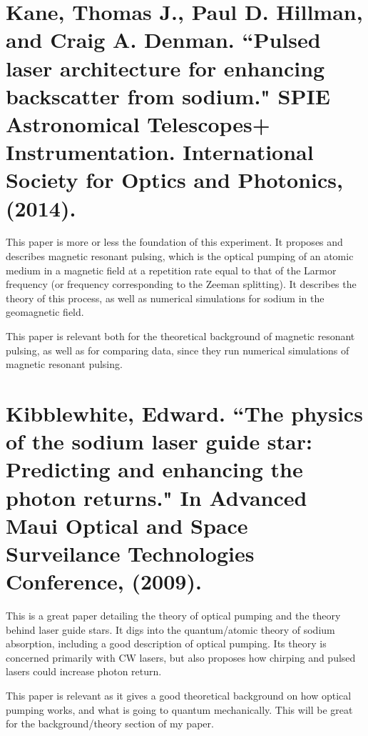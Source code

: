 \documentclass{article}
\begin{document}


%

\section*{Kane, Thomas J., Paul D. Hillman, and Craig A. Denman. ``Pulsed laser architecture for enhancing backscatter from sodium." SPIE Astronomical Telescopes+ Instrumentation. International Society for Optics and Photonics, (2014).}

This paper is more or less the foundation of this experiment. It proposes and describes magnetic resonant pulsing, which is the optical pumping of an atomic medium in a magnetic field at a repetition rate equal to that of the Larmor frequency (or frequency corresponding to the Zeeman splitting). It describes the theory of this process, as well as numerical simulations for sodium in the geomagnetic field.

This paper is relevant both for the theoretical background of magnetic resonant pulsing, as well as for comparing data, since they run numerical simulations of magnetic resonant pulsing.

%


\section*{Kibblewhite, Edward. ``The physics of the sodium laser guide star: Predicting and enhancing the photon returns." In Advanced Maui Optical and Space Surveilance Technologies Conference, (2009).}

This is a great paper detailing the theory of optical pumping and the theory behind laser guide stars. It digs into the quantum/atomic theory of sodium absorption, including a good description of optical pumping. Its theory is concerned primarily with CW lasers, but also proposes how chirping and pulsed lasers could increase photon return.

This paper is relevant as it gives a good theoretical background on how optical pumping works, and what is going to quantum mechanically. This will be great for the background/theory section of my paper.
\end{document}
